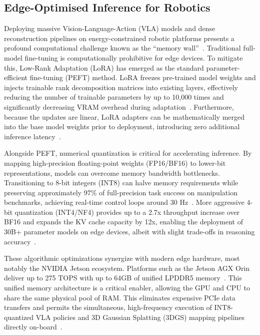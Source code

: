 \documentclass[conference]{IEEEtran}
\begin{document}
\subsection{Edge-Optimised Inference for Robotics}
\label{subsec:edge_inference}

Deploying massive Vision-Language-Action (VLA) models and dense reconstruction pipelines on energy-constrained robotic platforms presents a profound computational challenge known as the ``memory wall''~\cite{edge_opt2024}. Traditional full-model fine-tuning is computationally prohibitive for edge devices. To mitigate this, Low-Rank Adaptation (LoRA) has emerged as the standard parameter-efficient fine-tuning (PEFT) method. LoRA freezes pre-trained model weights and injects trainable rank decomposition matrices into existing layers, effectively reducing the number of trainable parameters by up to 10,000 times and significantly decreasing VRAM overhead during adaptation~\cite{hu2021lora, wang2024lorafusion}. Furthermore, because the updates are linear, LoRA adapters can be mathematically merged into the base model weights prior to deployment, introducing zero additional inference latency~\cite{11042839}.

Alongside PEFT, numerical quantization is critical for accelerating inference. By mapping high-precision floating-point weights (FP16/BF16) to lower-bit representations, models can overcome memory bandwidth bottlenecks. Transitioning to 8-bit integers (INT8) can halve memory requirements while preserving approximately 97\% of full-precision task success on manipulation benchmarks, achieving real-time control loops around 30 Hz~\cite{vla_concepts_2024}. More aggressive 4-bit quantization (INT4/NF4) provides up to a 2.7x throughput increase over BF16 and expands the KV cache capacity by 12x, enabling the deployment of 30B+ parameter models on edge devices, albeit with slight trade-offs in reasoning accuracy~\cite{edge_opt2024}.

These algorithmic optimizations synergize with modern edge hardware, most notably the NVIDIA Jetson ecosystem. Platforms such as the Jetson AGX Orin deliver up to 275 TOPS with up to 64GB of unified LPDDR5 memory~\cite{bvm2024jetson}. This unified memory architecture is a critical enabler, allowing the GPU and CPU to share the same physical pool of RAM. This eliminates expensive PCIe data transfers and permits the simultaneous, high-frequency execution of INT8-quantized VLA policies and 3D Gaussian Splatting (3DGS) mapping pipelines directly on-board~\cite{edge_opt2024}.
\end{document}
